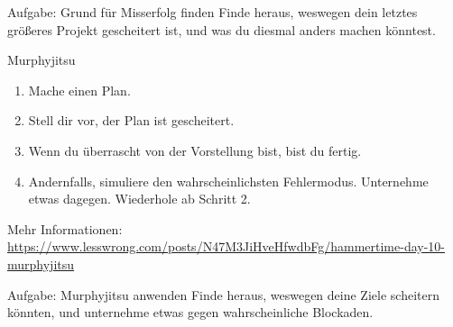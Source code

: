 \begin{frame}[c]
    \begin{block}{Aufgabe: Grund für Misserfolg finden}
        Finde heraus, weswegen dein letztes größeres Projekt gescheitert ist,
        und was du diesmal anders machen könntest.
    \end{block}
\end{frame}


\begin{frame}[c]{Murphyjitsu}
    \large
    \begin{enumerate}[<+(1)->]
        \item Mache einen Plan.
        \item Stell dir vor, der Plan ist gescheitert.
        \item Wenn du überrascht von der Vorstellung bist, bist du fertig.
        \item Andernfalls, simuliere den wahrscheinlichsten Fehlermodus. Unternehme etwas dagegen. Wiederhole ab Schritt 2.
    \end{enumerate}
    \pause
    \tiny
    Mehr Informationen: \url{https://www.lesswrong.com/posts/N47M3JiHveHfwdbFg/hammertime-day-10-murphyjitsu}
\end{frame}


\begin{frame}[c]
    \begin{block}{Aufgabe: Murphyjitsu anwenden}
        Finde heraus, weswegen deine Ziele scheitern könnten, und unternehme
        etwas gegen wahrscheinliche Blockaden.
    \end{block}
\end{frame}


